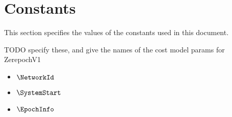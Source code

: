 \section{Constants}

This section specifies the values of the constants used in this document.

\begin{note}
  TODO specify these, and give the names of the cost model params for ZerepochV1
\end{note}

\begin{itemize}
  \item $\NetworkId$

  \item $\SystemStart$

  \item $\EpochInfo$

\end{itemize}
